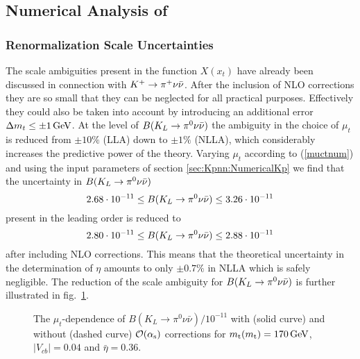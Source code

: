 \subsection{Numerical Analysis of \klpnn}
\label{sec:Kpnn:NumericalKL}
\subsubsection{Renormalization Scale Uncertainties}
\label{sec:Kpnn:NumericalKL:RSU}
The scale ambiguities present in the function $X(x_t)$ have already been
discussed in connection with $K^+ \to \pi^+\nu\bar\nu$. After the inclusion of NLO
corrections they are so small that they can be neglected for all
practical purposes. Effectively they could also be taken into
account by introducing an additional error $\Delta m_t\leq\pm 1\, {\rm GeV}$.
At the level of $B(K_L \to \pi^0\nu\bar\nu)$ the ambiguity in the choice of $\mu_t$ is
reduced from $\pm 10\%$ (LLA) down to $\pm 1\%$ (NLLA), which
considerably increases the predictive power of the theory. Varying
$\mu_t$ according to (\ref{muctnum}) and using the input parameters
of section \ref{sec:Kpnn:NumericalKp} we find that the uncertainty
in $B(K_L \to \pi^0\nu\bar\nu)$
\begin{equation}\label{varbklpnLO}
2.68\cdot 10^{-11}\leq B(K_L \to \pi^0\nu\bar\nu)\leq 3.26\cdot 10^{-11}
\end{equation}
present in the leading order is reduced to
\begin{equation}\label{varbklpnNLO}
2.80\cdot 10^{-11}\leq B(K_L \to \pi^0\nu\bar\nu)\leq 2.88\cdot 10^{-11}
\end{equation}
after including NLO corrections. This means that the theoretical
uncertainty in the determination of $\eta$ amounts to only $\pm 0.7\%$
in NLLA which is safely negligible.
The reduction of the scale ambiguity for $B(K_L \to \pi^0\nu\bar\nu)$ is further 
illustrated in fig.\ \ref{fig:klpnmut}.

\begin{figure}[hbt]
\vspace{0.10in}
\centerline{
\epsfysize=5in
 }
\vspace{0.08in}
\caption[]{
The $\mu_t$-dependence of $B(K_L \to \pi^0\nu\bar\nu)/10^{-11}$ with
(solid curve) and without (dashed curve) ${\cal O}(\alpha_{\rm s})$ corrections for
$m_{\rm t}(m_{\rm t})=170\, {\rm GeV}$, $|V_{cb}|=0.04$ and $\bar\eta=0.36$.
\label{fig:klpnmut}}
\end{figure}

